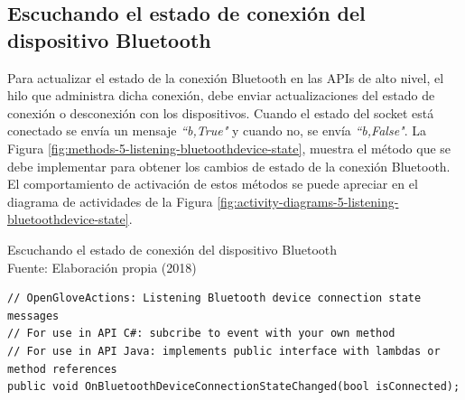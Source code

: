 \subsection{Escuchando el estado de conexión del dispositivo Bluetooth}
\label{subsection:reading-bluetooth-device-state}

Para actualizar el estado de la conexión Bluetooth en las APIs de alto nivel, el hilo que administra dicha conexión, debe enviar  actualizaciones del estado de conexión o desconexión con los dispositivos. Cuando el estado del socket está conectado se envía un mensaje  \textit{``b,True"}  y cuando no, se envía \textit{``b,False"}. La Figura \ref{fig:methods-5-listening-bluetoothdevice-state}, muestra el método que se debe implementar para obtener los cambios de estado de la conexión Bluetooth.  El comportamiento de activación de estos métodos se puede apreciar en el diagrama de actividades de la Figura \ref{fig:activity-diagrams-5-listening-bluetoothdevice-state}.

\begin{algorithm}[!ht]
  \begin{center}
   	\captionsetup{justification=centering}
    \caption[Escuchando el estado de conexión del dispositivo Bluetooth]{Escuchando el estado de conexión del dispositivo Bluetooth\\ \tab[4cm] Fuente: Elaboración propia (2018)}
    \label{fig:methods-5-listening-bluetoothdevice-state}
  \end{center}
  \begin{lstlisting}
// OpenGloveActions: Listening Bluetooth device connection state messages
// For use in API C#: subcribe to event with your own method
// For use in API Java: implements public interface with lambdas or method references
public void OnBluetoothDeviceConnectionStateChanged(bool isConnected);
\end{lstlisting}
\end{algorithm}

